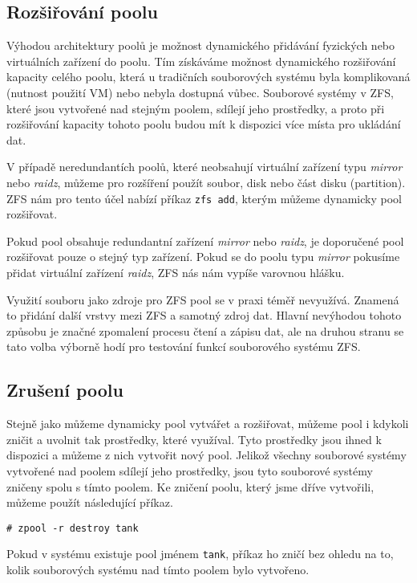 \subsection{Rozšiřování poolu}
Výhodou architektury poolů je možnost dynamického přidávání fyzických nebo virtuálních zařízení do poolu. Tím získáváme možnost dynamického rozšiřování kapacity celého poolu, která u tradičních souborových systému byla komplikovaná (nutnost použití VM) nebo nebyla dostupná vůbec. Souborové systémy v ZFS, které jsou vytvořené nad stejným poolem, sdílejí jeho prostředky, a proto při rozšiřování kapacity tohoto poolu budou mít k dispozici více místa pro ukládání dat.

V případě neredundantích poolů, které neobsahují virtuální zařízení typu \emph{mirror} nebo \emph{raidz}, můžeme pro rozšíření použít soubor, disk nebo část disku (partition). ZFS nám pro tento účel nabízí příkaz \verb|zfs add|, kterým můžeme dynamicky pool rozšiřovat.

Pokud pool obsahuje redundantní zařízení \emph{mirror} nebo \emph{raidz}, je doporučené pool rozšiřovat pouze o stejný typ zařízení. Pokud se do poolu typu \emph{mirror} pokusíme přidat virtuální zařízení \emph{raidz}, ZFS nás nám vypíše varovnou hlášku.

Využití souboru jako zdroje pro ZFS pool se v praxi téměř nevyužívá. Znamená to přidání další vrstvy mezi ZFS a samotný zdroj dat. Hlavní nevýhodou tohoto způsobu je značné zpomalení procesu čtení a zápisu dat, ale na druhou stranu se tato volba výborně hodí pro testování funkcí souborového systému ZFS.

\subsection{Zrušení poolu}
Stejně jako můžeme dynamicky pool vytvářet a rozšiřovat, můžeme pool i kdykoli zničit a uvolnit tak prostředky, které využíval. Tyto prostředky jsou ihned k dispozici a můžeme z nich vytvořit nový pool. Jelikož všechny souborové systémy vytvořené nad poolem sdílejí jeho prostředky, jsou tyto souborové systémy zničeny spolu s tímto poolem. Ke zničení poolu, který jsme dříve vytvořili, můžeme použít následující příkaz.
\begin{verbatim}
# zpool -r destroy tank
\end{verbatim}
Pokud v systému existuje pool jménem \verb|tank|, příkaz ho zničí bez ohledu na to, kolik souborových systému nad tímto poolem bylo vytvořeno.

